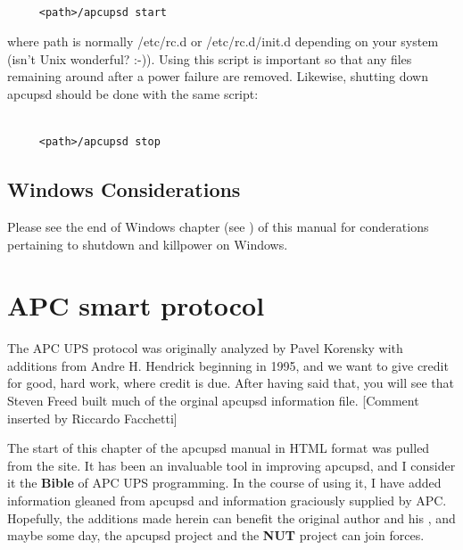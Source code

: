 {{{{{{{{{{{{{{{{{\footnotesize
\begin{verbatim}
     
     <path>/apcupsd start
\end{verbatim}
\normalsize

where \lt{}path\gt{} is normally /etc/rc.d or /etc/rc.d/init.d depending on
your system (isn't Unix wonderful? :-)). Using this script is important so
that any files remaining around after a power failure are removed. Likewise,
shutting down apcupsd should be done with the same script: 

\footnotesize
\begin{verbatim}
     
     <path>/apcupsd stop
\end{verbatim}
\normalsize

\label{Windows-Considerations}

\subsection*{Windows Considerations}

\label{index-Windows-Considerations-261}
Please see the end of Windows chapter (see 
) of this
manual for conderations pertaining to shutdown and killpower on Windows. 

\label{APC-smart-protocol}

\section*{APC smart protocol}

\label{index-Smart-protocol-262}
\label{index-Protocol-Smart-263}
The APC UPS protocol was originally analyzed by Pavel Korensky with additions
from Andre H. Hendrick beginning in 1995, and we want to give credit for good,
hard work, where credit is due. After having said that, you will see that
Steven Freed built much of the orginal apcupsd information file. [Comment
inserted by Riccardo Facchetti]  

The start of this chapter of the apcupsd manual in HTML format was pulled from
the 
 site. It has been an
invaluable tool in improving apcupsd, and I consider it the {\bf Bible} of APC
UPS programming. In the course of using it, I have added information gleaned
from apcupsd and information graciously supplied by APC. Hopefully, the
additions made herein can benefit the original author and his 
, and maybe some day,
the apcupsd project and the {\bf NUT} project can join forces. 

}}}}}}}}}}}}}}}}}
